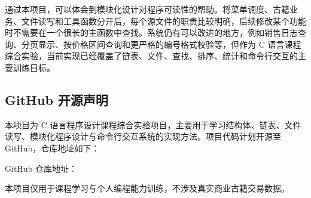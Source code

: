 \documentclass[UTF8,a4paper,zihao=5,fontset=fandol]{ctexart}
\begin{document}
通过本项目，可以体会到模块化设计对程序可读性的帮助。将菜单调度、古籍业务、文件读写和工具函数分开后，每个源文件的职责比较明确，后续修改某个功能时不需要在一个很长的主函数中查找。系统仍有可以改进的地方，例如销售日志查询、分页显示、按价格区间查询和更严格的编号格式校验等，但作为 C 语言课程综合实验，当前实现已经覆盖了链表、文件、查找、排序、统计和命令行交互的主要训练目标。

\subsection*{GitHub 开源声明}

本项目为 C 语言程序设计课程综合实验项目，主要用于学习结构体、链表、文件读写、模块化程序设计与命令行交互系统的实现方法。项目代码计划开源至 GitHub，仓库地址如下：

GitHub 仓库地址：\underline{\makebox[7cm][c]{}}

本项目仅用于课程学习与个人编程能力训练，不涉及真实商业古籍交易数据。
\end{document}
